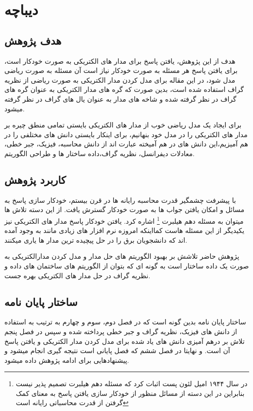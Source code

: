 
\chapter{دیباچه}

\section{هدف پژوهش}

هدف از این پژوهش، یافتن پاسخ برای مدار های الکتریکی به صورت خودکار %
است، برای یافتن پاسخ هر مسئله به صورت خودکار نیاز است آن مسئله به صورت ریاضی مدل شود، در این مقاله برای مدل 
کردن مدار الکتریکی به صورت ریاضی از نظریه گراف
استفاده شده است، بدین صورت که گره های مدار الکتریکی به عنوان گره های گراف در نظر گرفته شده و شاخه های مدار به عنوان یال های گراف در نظر گرفته میشود.
 
برای ایجاد یک مدل ریاضی
خوب از مدار های الکتریکی بایستی تمامی منطق چیره بر مدار های الکتریکی را در مدل خود بنهانیم، برای اینکار بایستی دانش های مختلفی را در هم آمیزیم،این دانش های در هم آمیخته
عبارت اند از
دانش محاسبه،
 فیزیک،
  جبر خطی،
   معادلات دیفرانسل،
     نظریه گراف،داده ساختار ها
      و طراحی الگوریتم.
\section{کاربرد پژوهش}
با پیشرفت چشمگیر قدرت محاسبه رایانه ها در قرن بیستم،
خودکار سازی پاسخ به مسائل و امکان یافتن جواب ها به صورت خودکار گسترش یافت.
از این دسته تلاش ها میتوان به مسئله دهم هیلبرت 
\footnote{	  در سال ۱۹۴۴ امیل لئون پست اثبات کرد که مسئله دهم هیلبرت تصمیم پذیر نیست بنابراین در این دسته از مسائل منظور از خودکار سازی یافتن پاسخ به معنای کمک گرفتن از قدرت محاسباتی رایانه است 	}  
اشاره کرد. یافتن خودکار پاسخ مدار های الکتریکی نیز یکیدیگر از این مسئله هاست کمااینکه امروزه نرم افزار
های زیادی مانند
 به وجود آمده اند که دانشجویان برق را در حل پیچیده ترین مدار ها یاری میکنند.
 
 پژوهش حاضر تلاشش بر بهبود الگوریتم های حل مدار و مدل کردن مدارالکتریکی به صورت یک داده ساختار است
 به گونه ای که بتوان از الگوریتم های ساختمان های داده و نظریه گراف در حل مدار های الکتریکی بهره جست.
\section{ساختار پایان نامه}
ساختار پایان نامه بدین گونه است که در فصل دوم، سوم و چهارم به ترتیب به استفاده از دانش های فیزیک، نظریه گراف و جبر خطی پرداخته شده و سپس در فصل پنجم تلاش بر درهم آمیزی دانش های یاد شده برای مدل کردن مدار الکتریکی و یافتن پاسخ آن است.
و نهایتا در فصل ششم که فصل پایانی است نتیجه گیری انجام میشود و پیشنهادهایی برای ادامه پژوهش داده میشود.


